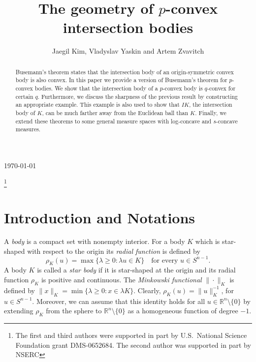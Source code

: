 \documentclass[12pt]{amsart} %
\renewcommand{\[}{\left[}
\renewcommand{\(}{\left(}
\renewcommand{\]}{\right]}
\renewcommand{\)}{\right)}
\renewcommand{\ge}{\geqslant}
\newcommand{\la}{\lambda}
\begin{document}
\hfill\today
\bigskip
\author{Jaegil Kim, Vladyslav Yaskin and Artem Zvavitch}

\address{Department of Mathematics, Kent State University,
Kent, OH 44242, USA} 


\address{ Department of Mathematical and
Statistical Sciences,
University of Alberta,
Edmonton, AB, T6G 2G1,
Canada } 

\address{Department of Mathematics, Kent State University,
Kent, OH 44242, USA} 

\thanks{The first and third authors were supported in part by U.S.~National Science Foundation grant
 DMS-0652684. The second author was supported in part by NSERC}  
\title{The geometry of $p$-convex intersection bodies}



\begin{abstract} Busemann's theorem states that the intersection body of an origin-symmetric convex body is also convex.
In this paper we provide a version of Busemann's theorem for $p$-convex bodies. We show that the intersection body of a $p$-convex body is $q$-convex for certain $q$. Furthermore, we discuss the sharpness of the previous result  by constructing an appropriate example. This example is also used to show that $IK$, the intersection body of $K$, can be much farther away from the Euclidean ball than $K$.  Finally, we extend these theorems to some general measure spaces with log-concave and $s$-concave measures. \end{abstract}

\maketitle



\section{Introduction and Notations}


A {\em body} is   a compact  set with nonempty interior. For a body $K$ which is star-shaped with respect to the origin its {\em radial function}  is defined by
$$
\rho_K(u) = \max \{\la \ge 0 : \la u \in K\} \quad\mbox{for every } u\in S^{n-1}.
$$
A body $K$ is called a {\em star body} if it is star-shaped at the origin and its radial function $\rho_K$ is positive and continuous.
The {\em Minkowski functional} $\|\cdot\|_K$   is defined by $\|x\|_K = \min \{\la \ge 0 : x \in \la K\}$. Clearly, $\rho_K(u)=\|u\|_K^{-1}$, for $u \in S^{n-1}$. Moreover, we can assume that this identity holds for all $u\in \mathbb R^n\setminus\{0\}$ by extending $\rho_K$ from the sphere to $\mathbb R^n\setminus\{0\}$ as a homogeneous function of degree $-1$.
\end{document}
